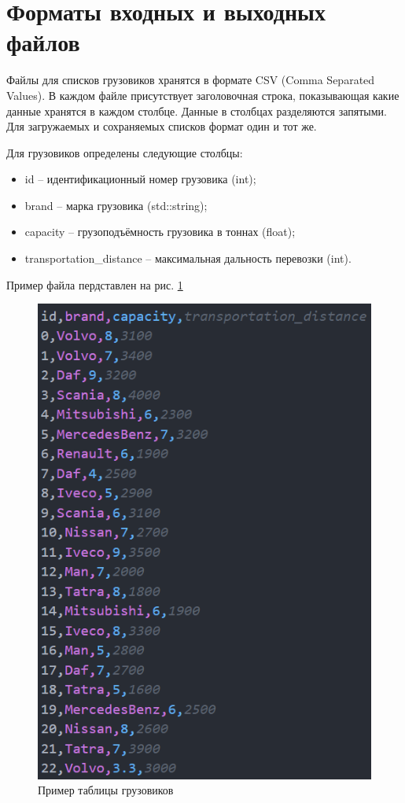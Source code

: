 \section*{Форматы входных и выходных файлов}

Файлы для списков грузовиков хранятся в формате CSV (Comma Separated Values). 
В каждом файле присутствует заголовочная строка, 
показывающая какие данные хранятся в каждом столбце. 
Данные в столбцах разделяются запятыми.
Для загружаемых и сохраняемых списков формат один и тот же.

Для грузовиков определены следующие столбцы:
\begin{itemize}
    \item id -- идентификационный номер грузовика (int);
    \item brand -- марка грузовика (std::string);
    \item capacity -- грузоподъёмность грузовика в тоннах (float);
    \item transportation\_distance -- максимальная дальность перевозки (int).
\end{itemize}

Пример файла пердставлен на рис. \ref{file_example}

\begin{figure}[hpt!]
    \centering
    \includegraphics[width=0.5\linewidth]{photo/file_example}
    \caption{Пример таблицы грузовиков}
    \label{file_example}
\end{figure}